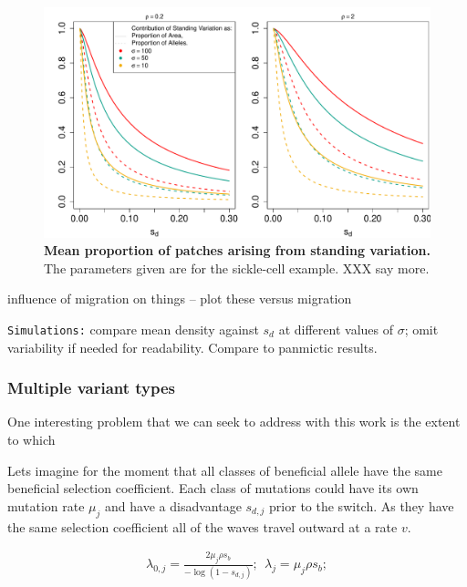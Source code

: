 \documentclass{article}
\begin{document}
\begin{figure}[ht]
\begin{center}
  \includegraphics[width=1.0\textwidth]{G6PD_standing_var_proportion}
\caption{ %
{\bf Mean proportion of patches arising from standing variation.} The parameters given are for the sickle-cell example.  XXX say more.
} \label{G6PD_standing_var_proportion}
\end{center}
\end{figure}



influence of migration on things -- plot these versus migration 

{\tt Simulations:} compare mean density against $s_d$ at different values of $\sigma$; omit variability if needed for readability.
Compare to panmictic results.


\subsubsection{Multiple variant types}

One interesting problem that we can seek to address with this work is
the extent to which 

Lets imagine for the moment that all classes of beneficial allele have
the same beneficial selection coefficient. 
Each class of mutations could have its own mutation rate $\mu_j$ and
have a disadvantage $s_{d,j}$ prior to the switch. As they have the
same selection coefficient all of the waves travel outward at a rate
$v$. 

\begin{align}
    \lambda_{0,j} = \frac{ 2 \mu_j \rho s_b }{ -\log(1-s_{d,j}) } ; ~~      \lambda_{j} = \mu_j \rho s_b;
\end{align}
\end{document}
